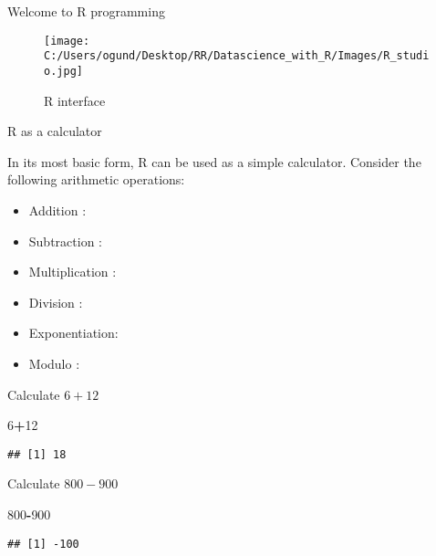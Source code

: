 \documentclass[ignorenonframetext,]{beamer}
\newenvironment{Shaded}{\begin{snugshade}}{\end{snugshade}}
\newcommand{\DecValTok}[1]{\textcolor[rgb]{0.00,0.00,0.81}{#1}}
\newcommand{\OperatorTok}[1]{\textcolor[rgb]{0.81,0.36,0.00}{\textbf{#1}}}
\providecommand{\tightlist}{%
  \setlength{\itemsep}{0pt}\setlength{\parskip}{0pt}}
\begin{document}
\begin{frame}{Welcome to R programming}

\begin{figure}
\centering
\texttt{[image: C:/Users/ogund/Desktop/RR/Datascience\_with\_R/Images/R\_studio.jpg]}
\caption{R interface}
\end{figure}

\end{frame}

\begin{frame}[fragile]{R as a calculator}

In its most basic form, R can be used as a simple calculator. Consider
the following arithmetic operations:

\begin{itemize}
\tightlist
\item
  Addition :
\item
  Subtraction :
\item
  Multiplication :
\item
  Division :
\item
  Exponentiation:
\item
  Modulo :
\end{itemize}

Calculate \(6 + 12\)

\begin{Shaded}
\begin{Highlighting}[]
\DecValTok{6}\OperatorTok{+}\DecValTok{12}
\end{Highlighting}
\end{Shaded}

\begin{verbatim}
## [1] 18
\end{verbatim}

Calculate \(800-900\)

\begin{Shaded}
\begin{Highlighting}[]
\DecValTok{800}\OperatorTok{-}\DecValTok{900}
\end{Highlighting}
\end{Shaded}

\begin{verbatim}
## [1] -100
\end{verbatim}

\end{frame}
\end{document}
